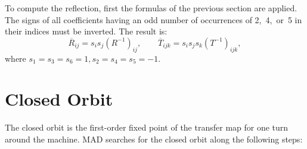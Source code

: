 To compute the reflection, first the formulas of the previous section
are applied.
The signs of all coefficients having an odd number of occurrences
of 2,~4,~or~5 in their indices must be inverted.
The result is:
\begin{equation}
\overline R_{ij} = s_i s_j (R^{-1})_{ij}, \qquad
\overline T_{ijk} = s_i s_j s_k (T^{-1})_{ijk},
\end{equation}
where $s_1 = s_3 = s_6 = 1, s_2 = s_4 = s_5 = -1$.
 
 
\section{Closed Orbit}
\label{s-co}
The closed orbit is the first-order fixed point of the transfer map
for one turn around the machine.
MAD searches for the closed orbit along the following steps:
 
